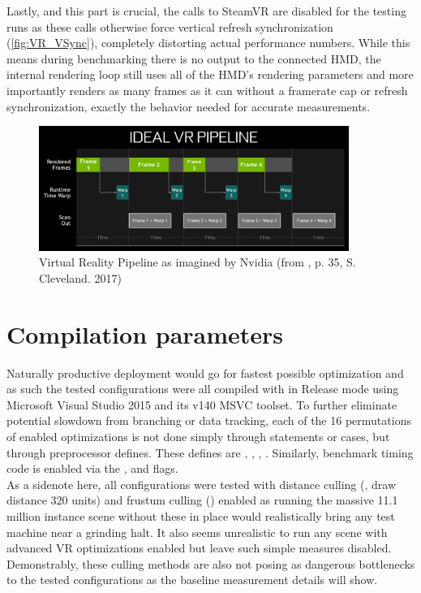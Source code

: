 Lastly, and this part is crucial, the  calls to SteamVR are disabled for the testing runs as these calls otherwise force vertical refresh synchronization (\autoref{fig:VR_VSync}), completely distorting actual performance numbers. While this means during benchmarking there is no output to the connected HMD, the internal rendering loop still uses all of the HMD's rendering parameters and more importantly renders as many frames as it can without a framerate cap or refresh synchronization, exactly the behavior needed for accurate measurements. 

\begin{figure}[htb]
  \centering
  \includegraphics[width=0.9\textwidth]{pictures/Nvidia_FCAT}
  \caption{Virtual Reality Pipeline as imagined by Nvidia (from \cite{Cleveland.2017}, p. 35, S. Cleveland. 2017)} \label{fig:VR_VSync}
\end{figure} 

\section{Compilation parameters}
Naturally productive deployment would go for fastest possible optimization and as such the tested configurations were all compiled with  in Release mode using Microsoft Visual Studio 2015 and its v140 MSVC toolset. 
To further eliminate potential slowdown from branching or data tracking, each of the 16 permutations of enabled optimizations is not done simply through  statements or  cases, but through preprocessor defines. These defines are , , , . Similarly, benchmark timing code is enabled via the ,  and  flags. \\
As a sidenote here, all configurations were tested with distance culling (, draw distance 320 units) and frustum culling () enabled as running the massive 11.1 million instance scene without these in place would realistically bring any test machine near a grinding halt. It also seems unrealistic to run any scene with advanced VR optimizations enabled but leave such simple measures disabled. 
Demonstrably, these culling methods are also not posing as dangerous bottlenecks to the tested configurations as the baseline measurement details will show. 

